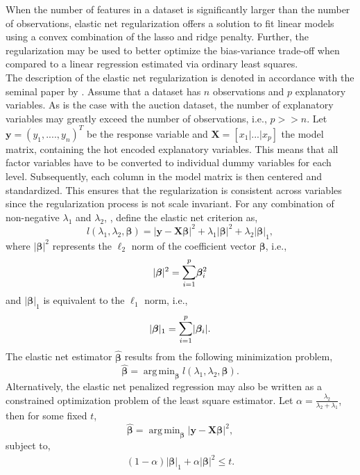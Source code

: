 \documentclass[a4paper,12pt, headsepline]{scrartcl}
\DeclareMathOperator*{\argminA}{arg\,min}
\numberwithin{equation}{section}
\begin{document}
When the number of features in a dataset is significantly larger than the number of observations, elastic net regularization offers a solution to fit linear models using a convex combination of the lasso and ridge penalty. Further, the regularization may be used to better optimize the bias-variance trade-off when compared to a linear regression estimated via ordinary least squares.\\
The description of the elastic net regularization is denoted in accordance with the seminal paper by \citet{hastie03}. Assume that a dataset has $n$ observations and $p$ explanatory variables. As is the case with the auction dataset, the number of explanatory variables may greatly exceed the number of observations, i.e., $p >> n$. Let $\mathbf{y} = (y_1, ...., y_n)^T$ be the response variable and $\mathbf{X} = [x_1|...|x_p]$ the model matrix, containing the hot encoded explanatory variables. This means that all factor variables have to be converted to individual dummy variables for each level. Subsequently, each column in the model matrix is then centered and standardized. This ensures that the regularization is consistent across variables since the regularization process is not scale invariant. For any combination of non-negative $\lambda_1$ and $\lambda_2$, \citet{hastie03}, define the elastic net criterion as,
\[
l(\lambda_1, \lambda_2, \bm{\beta}) = |\mathbf{y} - \mathbf{X}\bm{\beta}|^2 +\lambda_1|\bm{\beta}|^2 +\lambda_2|\bm{\beta}|_1, 
\]
where $|\bm{\beta}|^2$ represents the $\ell_2$ norm of the coefficient vector $\bm{\beta}$, i.e., 
\[
|\bm{\beta}|^2 = \mathlarger{\sum}\limits_{i = 1}^{p}\bm{\beta}_i^2
\]
and $|\bm{\beta}|_1$ is equivalent to the $\ell_1$ norm, i.e.,  
\[
|\bm{\beta}|_1 = \mathlarger{\sum}\limits_{i = 1}^{p}|\bm{\beta}_i|.
\]
The elastic net estimator $\bm{\hat{\beta}}$ results from the following minimization problem,
\[
\bm{\hat{\beta}} = \argminA_{\bm{\beta}} l(\lambda_1, \lambda_2, \bm{\beta}).
\]
Alternatively, the elastic net penalized regression may also be written as a constrained optimization problem of the least square estimator. Let $\alpha = \frac{\lambda_2}{\lambda_2 + \lambda_1}$, then for some fixed $t$, 
\[
\bm{\hat{\beta}} = \argminA_{\bm{\beta}} |\mathbf{y} - \mathbf{X}\bm{\beta}|^2,
\]
subject to,
\begin{gather}
(1 - \alpha)|\bm{\beta}|_1 + \alpha|\bm{\beta}|^2 \leq t.
\end{gather}
\end{document}
